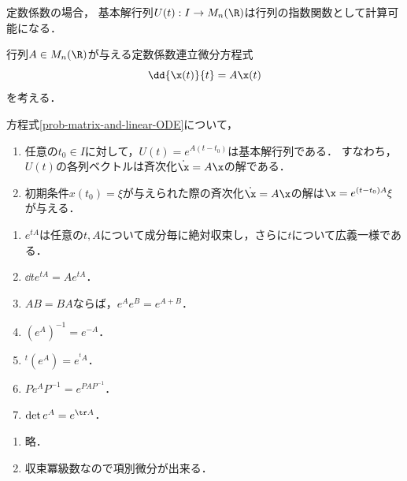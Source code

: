 \documentclass[uplatex,dvipdfmx]{jsreport}
\begin{document}
\begin{tcolorbox}[colframe=ForestGreen, colback=ForestGreen!10!white,breakable,colbacktitle=ForestGreen!40!white,coltitle=black,fonttitle=\bfseries\sffamily,
title=]
    定数係数の場合，
    基本解行列$U(t):I\to M_n(\R)$は行列の指数関数として計算可能になる．
\end{tcolorbox}

\begin{problem}\label{prob-matrix-and-linear-ODE}
    行列$A\in M_n(\R)$が与える定数係数連立微分方程式
    \[\dd{\x(t)}{t}=A\x(t)\]
    を考える．
\end{problem}

\begin{theorem}[解公式]
    方程式\ref{prob-matrix-and-linear-ODE}について，
    \begin{enumerate}
        \item 任意の$t_0\in I$に対して，$U(t)=e^{A(t-t_0)}$は基本解行列である．
        すなわち，$U(t)$の各列ベクトルは斉次化$\dot{\x}=A\x$の解である．
        \item 初期条件$x(t_0)=\xi$が与えられた際の斉次化$\dot{\x}=A\x$の解は$\x=e^{(t-t_0)A}\xi$が与える．
    \end{enumerate}
\end{theorem}

\begin{lemma}[行列の指数関数の性質]\mbox{}
    \begin{enumerate}
        \item $e^{tA}$は任意の$t,A$について成分毎に絶対収束し，さらに$t$について広義一様である．
        \item $\dd{}{t}e^{tA}=Ae^{tA}$．
        \item $AB=BA$ならば，$e^{A}e^B=e^{A+B}$．
        \item $(e^A)^{-1}=e^{-A}$．
        \item ${}^t\!(e^A)=e^{{}^t\!A}$．
        \item $Pe^{A}P^{-1}=e^{PAP^{-1}}$．
        \item $\det e^{A}=e^{\tr A}$．
    \end{enumerate}
\end{lemma}
\begin{Proof}\mbox{}
    \begin{enumerate}
        \item 略．
        \item 収束冪級数なので項別微分が出来る．
    \end{enumerate}
\end{Proof}
\end{document}
